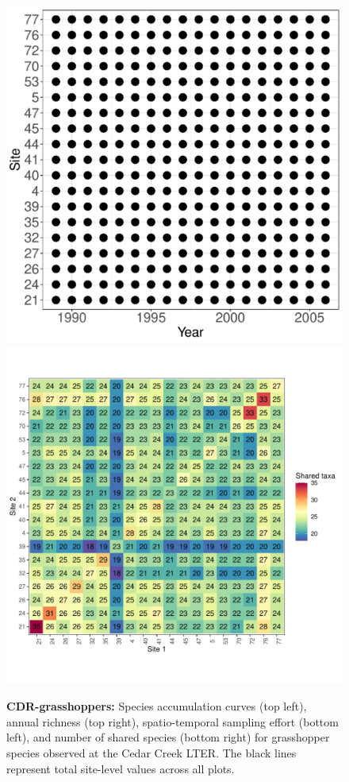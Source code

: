 \documentclass[11pt, oneside]{article}
\begin{document}
\begin{figure}[h!]
\includegraphics[scale = 0.4]{cdr-grasshopper-compagnoni_spatiotemporal_sampling_effort.pdf}
\includegraphics[scale = 0.4]{cdr-grasshopper-compagnoni_spp_shared.pdf}
\caption{{\bf CDR-grasshoppers:} Species accumulation curves (top left),  annual richness (top right), spatio-temporal sampling effort (bottom left), and number of shared species (bottom right) for grasshopper species observed at the Cedar Creek LTER. The black lines represent total site-level values across all plots.}
\label{cdr-grasshoppers}
\end{figure}
\end{document}
